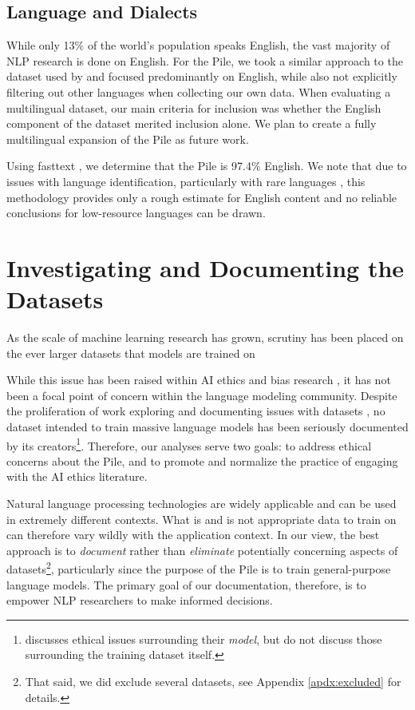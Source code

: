 \documentclass[11pt,a4paper]{article}
\begin{document}
\subsection{Language and Dialects}

While only 13\% of the world's population speaks English, the vast majority of NLP research is done on English. For the Pile, we took a similar approach to the dataset used by \citet{GPT3} and focused predominantly on English, while also not explicitly filtering out other languages when collecting our own data. When evaluating a multilingual dataset, our main criteria for inclusion was whether the English component of the dataset merited inclusion alone. We plan to create a fully multilingual expansion of the Pile as future work.

Using fasttext \cite{fast-text}, we determine that the Pile is 97.4\% English. We note that due to issues with language identification, particularly with rare languages \citet{caswell2020language}, this methodology provides only a rough estimate for English content and no reliable conclusions for low-resource languages can be drawn. 

\section{Investigating and Documenting the Datasets}\label{sec:doc}

As the scale of machine learning research has grown, scrutiny has been placed on the ever larger datasets that models are trained on \citep{pyrrhic-cv,best-practice2}

While this issue has been raised within AI ethics and bias research \citep{nlp-impact,disability-bias,nlp-bias-survey}, it has not been a focal point of concern within the language modeling community. Despite the proliferation of work exploring and documenting issues with datasets \citep{datasheets,datastatement,archives}, no dataset intended to train massive language models has been seriously documented by its creators\footnote{\citet{GPT3} discusses ethical issues surrounding their \textit{model}, but do not discuss those surrounding the training dataset itself.}. Therefore, our analyses serve two goals: to address ethical concerns about the Pile, and to promote and normalize the practice of engaging with the AI ethics literature.

Natural language processing technologies are widely applicable and can be used in extremely different contexts. What is and is not appropriate data to train on can therefore vary wildly with the application context. In our view, the best approach is to \textit{document} rather than \textit{eliminate} potentially concerning aspects of datasets\footnote{That said, we did exclude several datasets, see Appendix \ref{apdx:excluded} for details.}, particularly since the purpose of the Pile is to train general-purpose language models. The primary goal of our documentation, therefore, is to empower NLP researchers to make informed decisions.
\end{document}
